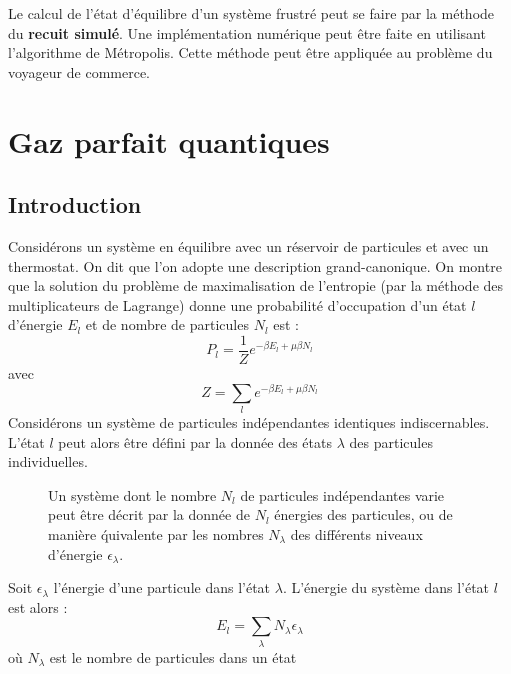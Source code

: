 \documentclass[12pt]{book}
\begin{document}
Le calcul de l'\'etat d'\'equilibre d'un syst\`eme frustr\'e peut se
faire par la m\'ethode du {\bf recuit simul\'e}. Une impl\'ementation
num\'erique peut \^etre faite en utilisant l'algorithme de
M\'etropolis. Cette m\'ethode peut \^etre
appliqu\'ee au probl\`eme du 
voyageur de commerce\cite{ma:compu:Press92}.
\section{Gaz parfait quantiques}\label{secgazparfq}
\subsection{Introduction}
Consid\'erons un syst\`eme en \'equilibre avec un r\'eservoir de
particules\cite{ph:physt:Diu89} et avec un thermostat. On dit que l'on
adopte une description grand-canonique. On montre que la solution du
probl\`eme de maximalisation de l'entropie (par la m\'ethode des
multiplicateurs de Lagrange) donne une probabilit\'e d'occupation d'un
\'etat $l$  d'\'energie $E_l$ et de nombre de particules $N_l$ est :
\begin{equation}
P_l=\frac{1}{Z}e^{-\beta E_l+\mu\beta N_l}
\end{equation}
avec
\begin{equation}
Z=\sum_le^{-\beta E_l+\mu\beta N_l}
\end{equation}
Consid\'erons un syst\`eme de particules ind\'ependantes identiques
indiscernables. L'\'etat $l$ peut alors \^etre d\'efini par la donn\'ee
des \'etats $\lambda$ des particules individuelles. 
\begin{figure}[htb]
 \centerline{}   
 \caption{Un syst\`eme dont le nombre $N_l$ de particules
ind\'ependantes varie peut \^etre d\'ecrit par la donn\'ee de $N_l$
\'energies des particules, ou de mani\`ere \'quivalente par les
nombres $N_\lambda$ des diff\'erents niveaux d'\'energie
$\epsilon_\lambda$. }
 \label{figoccup}
\end{figure}
Soit
$\epsilon_\lambda$ l'\'energie d'une particule dans l'\'etat
$\lambda$.
L'\'energie du syst\`eme dans l'\'etat $l$ est alors :
\begin{equation}
E_l=\sum_\lambda N_\lambda \epsilon_\lambda
\end{equation}
o\`u $N_\lambda$ est le nombre de particules dans un \'etat
\end{document}
